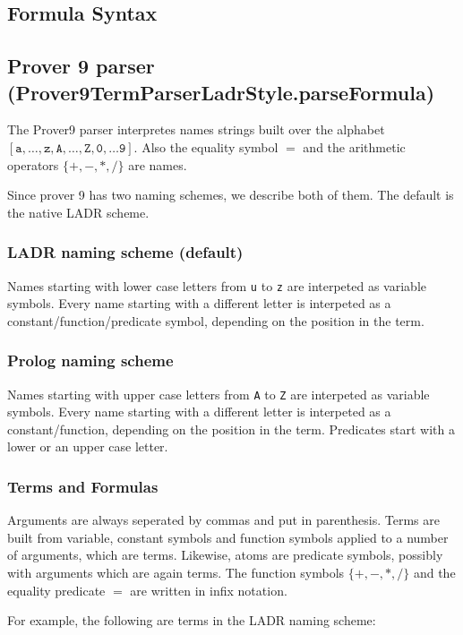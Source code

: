 \documentclass[a4paper,11pt]{article}
\begin{document}
\begin{appendix}
\section{Formula Syntax}
\label{app:formulasyntax}
\subsection{Prover 9 parser (Prover9TermParserLadrStyle.parseFormula)}

The Prover9 parser interpretes names strings built over the alphabet
 $[\mathtt{a, \ldots, z, A ,\ldots, Z, 0, \ldots 9} ]$. Also the
 equality symbol $=$ and the arithmetic operators $\{\mathtt{+,-,*,/}\}$
 are names.

Since prover 9 has two naming schemes, we describe both of them. The default
 is the native LADR scheme.

\subsubsection{LADR naming scheme (default)}

Names starting with lower case letters from \texttt{u} to \texttt{z} are
 interpeted as variable symbols. Every name starting with a different letter
 is interpeted as a constant/function/predicate symbol, depending on the
 position in the term.

\subsubsection{Prolog naming scheme}
Names starting with upper case letters from \texttt{A} to \texttt{Z} are
 interpeted as variable symbols. Every name starting with a different letter
 is interpeted as a constant/function, depending on the
 position in the term. Predicates start with a lower or an upper case letter.

\subsubsection{Terms and Formulas}
Arguments are always seperated by commas and put in parenthesis. Terms are
 built from variable, constant symbols and function symbols applied
 to a number of arguments, which are terms. Likewise, atoms are
 predicate symbols, possibly with arguments which are again terms. The
 function symbols $\{\mathtt{+,-,*,/}\}$ and the equality predicate $=$
 are written in infix notation.

For example, the following are terms in the LADR naming scheme:


\end{appendix}
\end{document}
